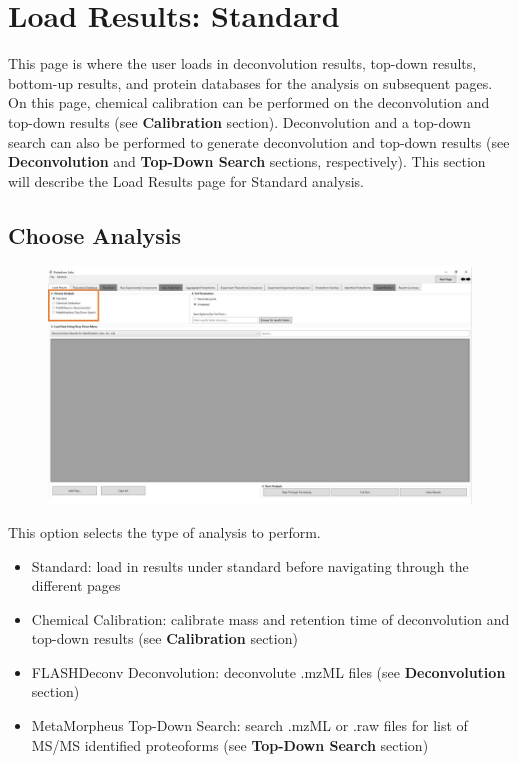 
\section{Load Results: Standard}

This page is where the user loads in deconvolution results, top-down results, bottom-up results, and protein databases for the analysis on subsequent pages. On this page, chemical calibration can be performed on the deconvolution and top-down results (see \textbf{Calibration} section). Deconvolution and a top-down search can also be performed to generate deconvolution and top-down results (see \textbf{Deconvolution} and \textbf{Top-Down Search} sections, respectively). This section will describe the Load Results page for Standard analysis.

\subsection{Choose Analysis}

\begin{figure}[htbp]
\centering
\includegraphics[scale=0.4]{figures/load_results_1.jpg}
\end{figure}

This option selects the type of analysis to perform.
\begin{itemize}
	\item Standard: load in results under standard before navigating through the different pages
	\item Chemical Calibration: calibrate mass and retention time of deconvolution and top-down results (see \textbf{Calibration} section)
	\item FLASHDeconv Deconvolution: deconvolute .mzML files (see \textbf {Deconvolution} section)
	\item MetaMorpheus Top-Down Search: search .mzML or .raw files for list of MS/MS identified proteoforms (see \textbf{Top-Down Search} section)
\end{itemize}


